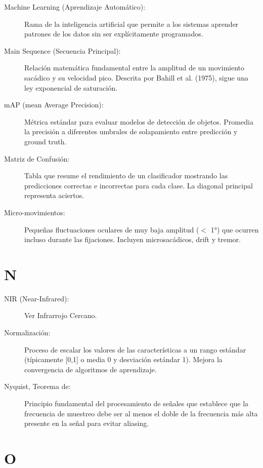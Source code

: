 \begin{description}
    \item[Machine Learning (Aprendizaje Automático):] Rama de la inteligencia artificial que permite a los sistemas aprender patrones de los datos sin ser explícitamente programados.
    
    \item[Main Sequence (Secuencia Principal):] Relación matemática fundamental entre la amplitud de un movimiento sacádico y su velocidad pico. Descrita por Bahill et al. (1975), sigue una ley exponencial de saturación.
    
    \item[mAP (mean Average Precision):] Métrica estándar para evaluar modelos de detección de objetos. Promedia la precisión a diferentes umbrales de solapamiento entre predicción y ground truth.
    
    \item[Matriz de Confusión:] Tabla que resume el rendimiento de un clasificador mostrando las predicciones correctas e incorrectas para cada clase. La diagonal principal representa aciertos.
    
    \item[Micro-movimientos:] Pequeñas fluctuaciones oculares de muy baja amplitud ($<$ 1°) que ocurren incluso durante las fijaciones. Incluyen microsacádicos, drift y tremor.
\end{description}

\section*{N}

\begin{description}
    \item[NIR (Near-Infrared):] Ver Infrarrojo Cercano.
    
    \item[Normalización:] Proceso de escalar los valores de las características a un rango estándar (típicamente [0,1] o media 0 y desviación estándar 1). Mejora la convergencia de algoritmos de aprendizaje.
    
    \item[Nyquist, Teorema de:] Principio fundamental del procesamiento de señales que establece que la frecuencia de muestreo debe ser al menos el doble de la frecuencia más alta presente en la señal para evitar aliasing.
\end{description}

\section*{O}

